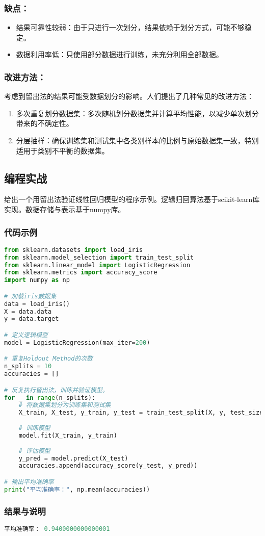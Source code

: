 \subsubsection{缺点：}
\begin{itemize}
\item 结果可靠性较弱：由于只进行一次划分，结果依赖于划分方式，可能不够稳定。
\item 数据利用率低：只使用部分数据进行训练，未充分利用全部数据。
\end{itemize}

\subsubsection{改进方法：}
考虑到留出法的结果可能受数据划分的影响。人们提出了几种常见的改进方法：

\begin{enumerate}
\item 多次重复划分数据集：多次随机划分数据集并计算平均性能，以减少单次划分带来的不确定性。
\item 分层抽样：确保训练集和测试集中各类别样本的比例与原始数据集一致，特别适用于类别不平衡的数据集。
\end{enumerate}

\subsection{编程实战}
给出一个用留出法验证线性回归模型的程序示例。逻辑归回算法基于scikit-learn库实现。数据存储与表示基于numpy库。
\subsubsection{代码示例}
\begin{lstlisting}[language=python]
from sklearn.datasets import load_iris
from sklearn.model_selection import train_test_split
from sklearn.linear_model import LogisticRegression
from sklearn.metrics import accuracy_score
import numpy as np

# 加载iris数据集
data = load_iris()
X = data.data
y = data.target

# 定义逻辑模型
model = LogisticRegression(max_iter=200)

# 重复Holdout Method的次数
n_splits = 10
accuracies = []

# 反复执行留出法，训练并验证模型。
for _ in range(n_splits):
    # 将数据集划分为训练集和测试集
    X_train, X_test, y_train, y_test = train_test_split(X, y, test_size=0.2)
    
    # 训练模型
    model.fit(X_train, y_train)
    
    # 评估模型
    y_pred = model.predict(X_test)
    accuracies.append(accuracy_score(y_test, y_pred))

# 输出平均准确率
print("平均准确率：", np.mean(accuracies))
\end{lstlisting}

\subsubsection{结果与说明}
\begin{lstlisting}[language=python]
平均准确率： 0.9400000000000001
\end{lstlisting}